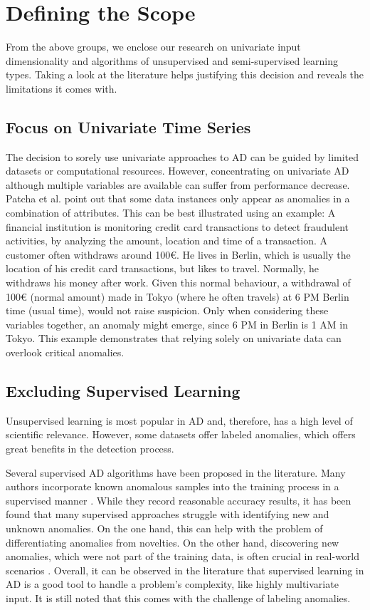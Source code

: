 \section{Defining the Scope}
From the above groups, we enclose our research on univariate input dimensionality and algorithms of unsupervised and semi-supervised learning types. Taking a look at the literature helps justifying this decision and reveals the limitations it comes with.

\subsection{Focus on Univariate Time Series}
The decision to sorely use univariate approaches to AD can be guided by limited datasets or computational resources. 
However, concentrating on univariate AD although multiple variables are available can suffer from performance decrease.
Patcha et al. \cite{Patcha2007} point out that some data instances only appear as anomalies in a combination of attributes. This can be best illustrated using an example:  A financial institution is monitoring credit card transactions to detect fraudulent activities, by analyzing the amount, location and time of a transaction. A customer often withdraws around 100€. He lives in Berlin, which is usually the location of his credit card transactions, but likes to travel. Normally, he withdraws his money after work. Given this normal behaviour, a withdrawal of 100€ (normal amount) made in Tokyo (where he often travels) at 6 PM Berlin time (usual time), would not raise suspicion. Only when considering these variables together, an anomaly might emerge, since 6 PM in Berlin is 1 AM in Tokyo. This example demonstrates that relying solely on univariate data can overlook critical anomalies.

\subsection{Excluding Supervised Learning}
Unsupervised learning is most popular in AD and, therefore, has a high level of scientific relevance. However, some datasets offer labeled anomalies, which offers great benefits in the detection process.

Several supervised AD algorithms have been proposed in the literature. Many authors incorporate known anomalous samples into the training process in a supervised manner  \cite{Ryzhikov2019, Marteau2017, Li2017}. While they record reasonable accuracy results, it has been found that many supervised approaches struggle with identifying new and unknown anomalies. On the one hand, this can help with the problem of differentiating anomalies from novelties. On the other hand, discovering new anomalies, which were not part of the training data, is often crucial in real-world scenarios \cite{Goernitz2013}. 
Overall, it can be observed in the literature that supervised learning in AD is a good tool to handle a problem's complexity, like highly multivariate input. It is still noted that this comes with the challenge of labeling anomalies.

